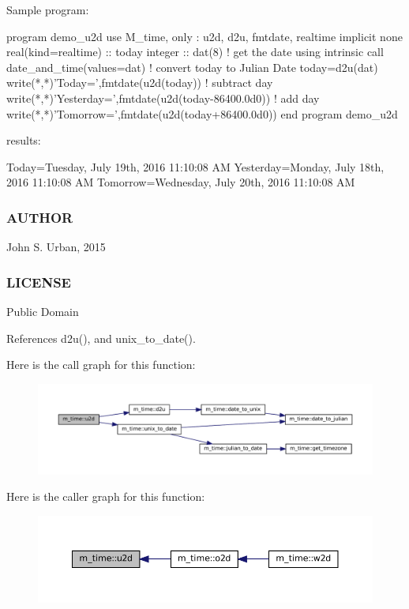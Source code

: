 \begin{DoxyVerb}Sample program:

 program demo_u2d
 use M_time, only : u2d, d2u, fmtdate, realtime
 implicit none
 real(kind=realtime) :: today
 integer :: dat(8)
    ! get the date using intrinsic
    call date_and_time(values=dat)
    ! convert today to Julian Date
    today=d2u(dat)
    write(*,*)'Today=',fmtdate(u2d(today))
    ! subtract day
    write(*,*)'Yesterday=',fmtdate(u2d(today-86400.0d0))
    ! add day
    write(*,*)'Tomorrow=',fmtdate(u2d(today+86400.0d0))
 end program demo_u2d

results:

 Today=Tuesday, July 19th, 2016 11:10:08 AM
 Yesterday=Monday, July 18th, 2016 11:10:08 AM
 Tomorrow=Wednesday, July 20th, 2016 11:10:08 AM
\end{DoxyVerb}


\subsubsection*{A\+U\+T\+H\+OR}

John S. Urban, 2015 \subsubsection*{L\+I\+C\+E\+N\+SE}

Public Domain 

References d2u(), and unix\+\_\+to\+\_\+date().

Here is the call graph for this function\+:\nopagebreak
\begin{figure}[H]
\begin{center}
\leavevmode
\includegraphics[width=350pt]{namespacem__time_a083bc231f8ba1879d7f86ab424e77d6c_cgraph}
\end{center}
\end{figure}
Here is the caller graph for this function\+:
\nopagebreak
\begin{figure}[H]
\begin{center}
\leavevmode
\includegraphics[width=350pt]{namespacem__time_a083bc231f8ba1879d7f86ab424e77d6c_icgraph}
\end{center}
\end{figure}
\mbox{\label{namespacem__time_acc62ada23f8fa2fe67b428702fbcbf1c}} 

